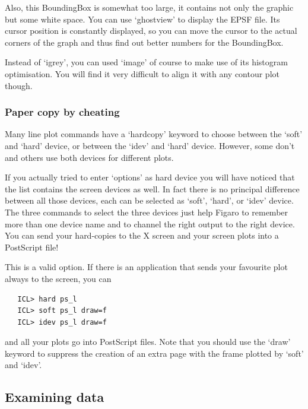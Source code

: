    Also, this BoundingBox is somewhat too large, it contains not only
   the graphic but some white space. You can use `ghostview' to display
   the EPSF file. Its cursor position is constantly displayed, so you
   can move the cursor to the actual corners of the graph and thus find
   out better numbers for the BoundingBox.

   Instead of `igrey', you can used `image' of course to make use of its
   histogram optimisation. You will find it very difficult to align it
   with any contour plot though.


\subsubsection{Paper copy by cheating}

   Many line plot commands have a `hardcopy' keyword to choose between
   the `soft' and `hard' device, or between the `idev' and `hard'
   device. However, some don't and others use both devices for different
   plots.

   If you actually tried to enter `options' as hard device you will have
   noticed that the list contains the screen devices as well. In fact
   there is no principal difference between all those devices, each can
   be selected as `soft', `hard', or `idev' device. The three commands
   to select the three devices just help Figaro to remember more than
   one device name and to channel the right output to the right device.
   You can send your hard-copies to the X screen and your screen plots
   into a PostScript file!

   This is a valid option. If there is an application that sends your
   favourite plot always to the screen, you can

\begin{verbatim}
   ICL> hard ps_l
   ICL> soft ps_l draw=f
   ICL> idev ps_l draw=f
\end{verbatim}

   and all your plots go into PostScript files. Note that you should use
   the `draw' keyword to suppress the creation of an extra page with the
   frame plotted by `soft' and `idev'.


\subsection{\label{examine}Examining data}

